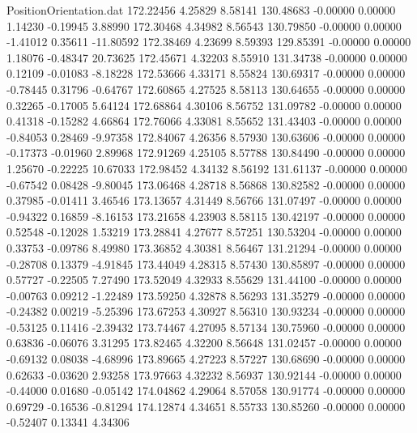 \begin{filecontents}{PositionOrientation.dat}
 172.22456    4.25829    8.58141   130.48683   -0.00000    0.00000    1.14230   -0.19945    3.88990
 172.30468    4.34982    8.56543   130.79850   -0.00000    0.00000   -1.41012    0.35611  -11.80592
 172.38469    4.23699    8.59393   129.85391   -0.00000    0.00000    1.18076   -0.48347   20.73625
 172.45671    4.32203    8.55910   131.34738   -0.00000    0.00000    0.12109   -0.01083   -8.18228
 172.53666    4.33171    8.55824   130.69317   -0.00000    0.00000   -0.78445    0.31796   -0.64767
 172.60865    4.27525    8.58113   130.64655   -0.00000    0.00000    0.32265   -0.17005    5.64124
 172.68864    4.30106    8.56752   131.09782   -0.00000    0.00000    0.41318   -0.15282    4.66864
 172.76066    4.33081    8.55652   131.43403   -0.00000    0.00000   -0.84053    0.28469   -9.97358
 172.84067    4.26356    8.57930   130.63606   -0.00000    0.00000   -0.17373   -0.01960    2.89968
 172.91269    4.25105    8.57788   130.84490   -0.00000    0.00000    1.25670   -0.22225   10.67033
 172.98452    4.34132    8.56192   131.61137   -0.00000    0.00000   -0.67542    0.08428   -9.80045
 173.06468    4.28718    8.56868   130.82582   -0.00000    0.00000    0.37985   -0.01411    3.46546
 173.13657    4.31449    8.56766   131.07497   -0.00000    0.00000   -0.94322    0.16859   -8.16153
 173.21658    4.23903    8.58115   130.42197   -0.00000    0.00000    0.52548   -0.12028    1.53219
 173.28841    4.27677    8.57251   130.53204   -0.00000    0.00000    0.33753   -0.09786    8.49980
 173.36852    4.30381    8.56467   131.21294   -0.00000    0.00000   -0.28708    0.13379   -4.91845
 173.44049    4.28315    8.57430   130.85897   -0.00000    0.00000    0.57727   -0.22505    7.27490
 173.52049    4.32933    8.55629   131.44100   -0.00000    0.00000   -0.00763    0.09212   -1.22489
 173.59250    4.32878    8.56293   131.35279   -0.00000    0.00000   -0.24382    0.00219   -5.25396
 173.67253    4.30927    8.56310   130.93234   -0.00000    0.00000   -0.53125    0.11416   -2.39432
 173.74467    4.27095    8.57134   130.75960   -0.00000    0.00000    0.63836   -0.06076    3.31295
 173.82465    4.32200    8.56648   131.02457   -0.00000    0.00000   -0.69132    0.08038   -4.68996
 173.89665    4.27223    8.57227   130.68690   -0.00000    0.00000    0.62633   -0.03620    2.93258
 173.97663    4.32232    8.56937   130.92144   -0.00000    0.00000   -0.44000    0.01680   -0.05142
 174.04862    4.29064    8.57058   130.91774   -0.00000    0.00000    0.69729   -0.16536   -0.81294
 174.12874    4.34651    8.55733   130.85260   -0.00000    0.00000   -0.52407    0.13341    4.34306

\end{filecontents}
